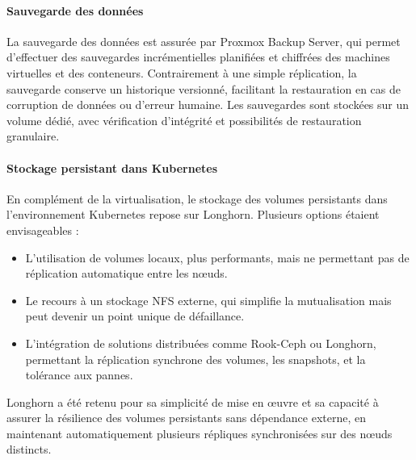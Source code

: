 \paragraph{Sauvegarde des données}
La sauvegarde des données est assurée par Proxmox Backup Server, qui permet d’effectuer des sauvegardes incrémentielles planifiées et chiffrées des machines virtuelles et des conteneurs. Contrairement à une simple réplication, la sauvegarde conserve un historique versionné, facilitant la restauration en cas de corruption de données ou d’erreur humaine. Les sauvegardes sont stockées sur un volume dédié, avec vérification d’intégrité et possibilités de restauration granulaire.

\paragraph{Stockage persistant dans Kubernetes}
En complément de la virtualisation, le stockage des volumes persistants dans l’environnement Kubernetes repose sur Longhorn. Plusieurs options étaient envisageables :
\begin{itemize}
	\item L’utilisation de volumes locaux, plus performants, mais ne permettant pas de réplication automatique entre les nœuds.
	\item Le recours à un stockage NFS externe, qui simplifie la mutualisation mais peut devenir un point unique de défaillance.
	\item L’intégration de solutions distribuées comme Rook-Ceph ou Longhorn, permettant la réplication synchrone des volumes, les snapshots, et la tolérance aux pannes.
\end{itemize}
Longhorn a été retenu pour sa simplicité de mise en œuvre et sa capacité à assurer la résilience des volumes persistants sans dépendance externe, en maintenant automatiquement plusieurs répliques synchronisées sur des nœuds distincts.

